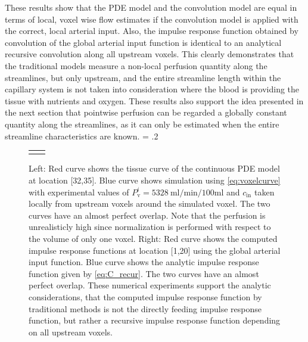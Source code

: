 \documentclass[journal,twocolumn]{IEEEtran}
\newcommand{\Perfv}{P_{\mathrm{v}}}
\newcommand{\siPml}{\milli\litre\per\minute\per100\milli\litre}
\newlength{\fwd}
\begin{document}
These results show that the PDE model and the convolution model are equal in terms of local, voxel wise flow estimates if the convolution model is applied with the correct, local arterial input. 
Also, the impulse response function obtained by convolution of the global arterial input function is identical to an analytical recursive convolution along all upstream voxels. 
This clearly demonstrates that the traditional models measure a non-local perfusion quantity along the streamlines, but only upstream, and the entire streamline length within the capillary system is not taken into consideration where the blood is providing the tissue with nutrients and oxygen. These results also support the idea presented in the next section that pointwise perfusion can be regarded a globally constant quantity along the streamlines, as it can only be estimated when the entire streamline characteristics are known.
	\fwd = .2\textwidth
	\begin{figure}
		{
		\tiny
		\begin{tabular}{p{\fwd} p{\fwd}}
			 & \\
		\end{tabular}
		}
		\caption{Left: Red curve shows the tissue curve of the continuous PDE model at location [32,35]. Blue curve shows simulation using \eqref{eq:voxelcurve} with experimental values of $\Perfv^i=\SI{5328}{\siPml}$ and $c_{\mathrm{in}}$ taken locally from upstream voxels around the simulated voxel. The two curves have an almost perfect overlap. Note that the perfusion is unrealisticly high since normalization is performed with respect to the volume of only one voxel. Right: Red curve shows the computed impulse response functions at location [1,20] using the global arterial input function. Blue curve shows the analytic impulse response function given by \eqref{eq:C_recur}. The two curves have an almost perfect overlap. These numerical experiments support the analytic considerations, that the computed impulse response function by traditional methods is not the directly feeding impulse response function, but rather a recursive impulse response function depending on all upstream voxels.}\label{fig:VoxelComp}
	\end{figure}
	

\end{document}
